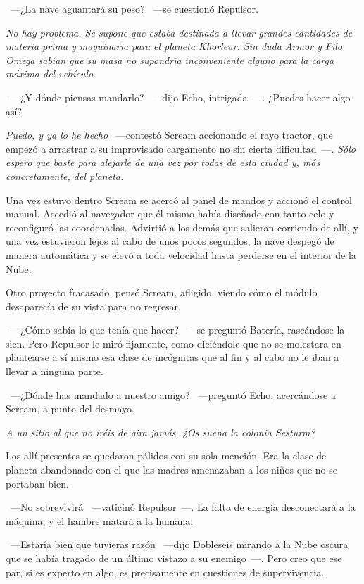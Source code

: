 ~---¿La nave aguantará su peso? ~---se cuestionó Repulsor.

\emph{No hay problema. Se supone que estaba destinada a llevar grandes cantidades de materia prima y maquinaria para el planeta Khorleur. Sin duda Armor y Filo Omega sabían que su masa no supondría inconveniente alguno para la carga máxima del vehículo.}

~---¿Y dónde piensas mandarlo? ~---dijo Echo, intrigada~---. ¿Puedes hacer algo así?

\emph{Puedo, y ya lo he hecho} ~---contestó Scream accionando el rayo tractor, que empezó a arrastrar a su improvisado cargamento no sin cierta dificultad~---. \emph{Sólo espero que baste para alejarle de una vez por todas de esta ciudad y, más concretamente, del planeta.}

Una vez estuvo dentro Scream se acercó al panel de mandos y accionó el control manual. Accedió al navegador que él mismo había diseñado con tanto celo y reconfiguró las coordenadas. Advirtió a los demás que salieran corriendo de allí, y una vez estuvieron lejos al cabo de unos pocos segundos, la nave despegó de manera automática y se elevó a toda velocidad hasta perderse en el interior de la Nube.

Otro proyecto fracasado, pensó Scream, afligido, viendo cómo el módulo desaparecía de su vista para no regresar.

~---¿Cómo sabía lo que tenía que hacer? ~---se preguntó Batería, rascándose la sien. Pero Repulsor le miró fijamente, como diciéndole que no se molestara en plantearse a sí mismo esa clase de incógnitas que al fin y al cabo no le iban a llevar a ninguna parte.

~---¿Dónde has mandado a nuestro amigo? ~---preguntó Echo, acercándose a Scream, a punto del desmayo.

\emph{A un sitio al que no iréis de gira jamás. ¿Os suena la colonia Sesturm?}

Los allí presentes se quedaron pálidos con su sola mención. Era la clase de planeta abandonado con el que las madres amenazaban a los niños que no se portaban bien.

~---No sobrevivirá ~---vaticinó Repulsor~---. La falta de energía desconectará a la máquina, y el hambre matará a la humana.

~---Estaría bien que tuvieras razón ~---dijo Dobleseis mirando a la Nube oscura que se había tragado de un último vistazo a su enemigo~---. Pero creo que ese par, si es experto en algo, es precisamente en cuestiones de supervivencia.

